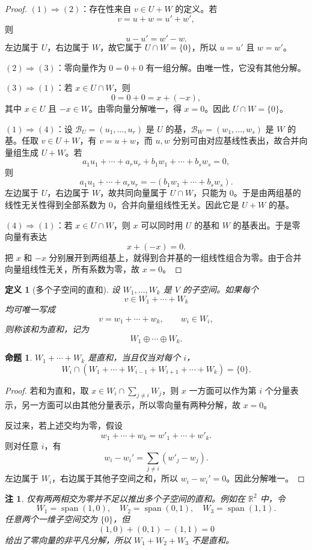\documentclass[UTF8,openany,zihao=-4]{ctexbook}
\theoremstyle{cnplain}
\newtheorem{definition}{定义}[chapter]
\newtheorem{proposition}{命题}[chapter]
\newtheorem{remark}{注}[chapter]
\newcommand{\R}{\mathbb R}
\newcommand{\Span}{\operatorname{span}}
\begin{document}
\begin{proof}
$(1)\Rightarrow(2)$：存在性来自 $v\in U+W$ 的定义。若
\[
v=u+w=u'+w',
\]
则
\[
u-u'=w'-w.
\]
左边属于 $U$，右边属于 $W$，故它属于 $U\cap W=\{0\}$，所以 $u=u'$ 且 $w=w'$。

$(2)\Rightarrow(3)$：零向量作为 $0=0+0$ 有一组分解。由唯一性，它没有其他分解。

$(3)\Rightarrow(1)$：若 $x\in U\cap W$，则
\[
0=0+0=x+(-x),
\]
其中 $x\in U$ 且 $-x\in W$。由零向量分解唯一，得 $x=0$。因此 $U\cap W=\{0\}$。

$(1)\Rightarrow(4)$：设 $\mathcal B_U=(u_1,
\ldots,u_r)$ 是 $U$ 的基，$\mathcal B_W=(w_1,
\ldots,w_s)$ 是 $W$ 的基。任取 $v\in U+W$，有 $v=u+w$，而 $u,w$ 分别可由对应基线性表出，故合并向量组生成 $U+W$。若
\[
a_1u_1+\cdots+a_ru_r+b_1w_1+\cdots+b_sw_s=0,
\]
则
\[
a_1u_1+\cdots+a_ru_r=-(b_1w_1+\cdots+b_sw_s).
\]
左边属于 $U$，右边属于 $W$，故共同向量属于 $U\cap W$，只能为 $0$。于是由两组基的线性无关性得到全部系数为 $0$，合并向量组线性无关。因此它是 $U+W$ 的基。

$(4)\Rightarrow(1)$：若 $x\in U\cap W$，则 $x$ 可以同时用 $U$ 的基和 $W$ 的基表出。于是零向量有表达
\[
x+(-x)=0.
\]
把 $x$ 和 $-x$ 分别展开到两组基上，就得到合并基的一组线性组合为零。由于合并向量组线性无关，所有系数为零，故 $x=0$。
\end{proof}

\begin{definition}[多个子空间的直和]
设 $W_1,
\ldots,W_k$ 是 $V$ 的子空间。如果每个
\[
v\in W_1+\cdots+W_k
\]
均可唯一写成
\[
v=w_1+\cdots+w_k,
\qquad w_i\in W_i,
\]
则称该和为直和，记为
\[
W_1\oplus\cdots\oplus W_k.
\]
\end{definition}

\begin{proposition}
$W_1+\cdots+W_k$ 是直和，当且仅当对每个 $i$，
\[
W_i\cap (W_1+\cdots+W_{i-1}+W_{i+1}+\cdots+W_k)=\{0\}.
\]
\end{proposition}

\begin{proof}
若和为直和，取 $x\in W_i\cap\sum_{j\ne i}W_j$，则 $x$ 一方面可以作为第 $i$ 个分量表示，另一方面可以由其他分量表示，所以零向量有两种分解，故 $x=0$。

反过来，若上述交均为零，假设
\[
w_1+\cdots+w_k=w'_1+\cdots+w'_k.
\]
则对任意 $i$，有
\[
w_i-w_i'=\sum_{j\ne i}(w'_j-w_j).
\]
左边属于 $W_i$，右边属于其他子空间之和，所以 $w_i-w_i'=0$。因此分解唯一。
\end{proof}

\begin{remark}
仅有两两相交为零并不足以推出多个子空间的直和。例如在 $\R^2$ 中，令
\[
W_1=\Span(1,0),
\quad W_2=\Span(0,1),
\quad W_3=\Span(1,1).
\]
任意两个一维子空间交为 $\{0\}$，但
\[
(1,0)+(0,1)-(1,1)=0
\]
给出了零向量的非平凡分解，所以 $W_1+W_2+W_3$ 不是直和。
\end{remark}
\end{document}
